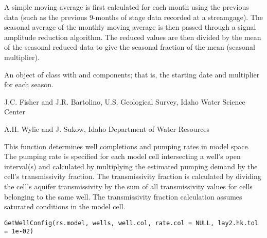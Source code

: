 \documentclass[letterpaper]{book}
\begin{document}
%
\begin{Details}\relax
A simple moving average is first calculated for each month using the previous data (such as the previous 9-months of stage data recorded at a streamgage).
The seasonal average of the monthly moving average is then passed through a signal amplitude reduction algorithm.
The reduced values are then divided by the mean of the seasonal reduced data to give the seasonal fraction of the mean (seasonal multiplier).
\end{Details}
%
\begin{Value}
An object of  class with  and  components; that is, the starting date and multiplier for each season.
\end{Value}
%
\begin{Author}\relax
J.C. Fisher and J.R. Bartolino, U.S. Geological Survey, Idaho Water Science Center

A.H. Wylie and J. Sukow, Idaho Department of Water Resources
\end{Author}
%
\begin{Examples}
\end{Examples}
%
\begin{Description}\relax
This function determines well completions and pumping rates in model space.
The pumping rate is specified for each model cell intersecting a well's open interval(s)
and calculated by multiplying the estimated pumping demand by the cell's transmissivity fraction.
The transmissivity fraction is calculated by dividing the cell's aquifer transmissivity by the sum of all transmissivity values for cells belonging to the same well.
The transmissivity fraction calculation assumes saturated conditions in the model cell.
\end{Description}
%
\begin{Usage}
\begin{verbatim}
GetWellConfig(rs.model, wells, well.col, rate.col = NULL, lay2.hk.tol = 1e-02)
\end{verbatim}
\end{Usage}
\end{document}
